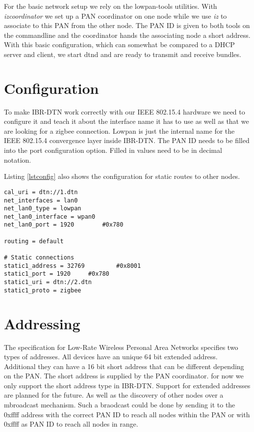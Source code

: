 For the basic network setup we rely on the lowpan-tools utilities. With
\emph{izcoordinator} we set up a PAN coordinator on one
node while we use \emph{iz} to associate to this PAN from the other node. The PAN ID is
given to both tools on the commandline and the coordinator hands the
associating node a short address. With this basic configuration, which can
somewhat be compared to a DHCP server and client, we start dtnd and are ready to
transmit and receive bundles.

\section{Configuration}

To make IBR-DTN work correctly with our IEEE 802.15.4 hardware we need to configure
it and teach it about the interface name it has to use as well as that we are
looking for a zigbee connection. Lowpan is just the internal name for the
IEEE 802.15.4 convergence layer inside IBR-DTN. The PAN ID needs to be filled into the
port configuration option. Filled in values need to be in decimal notation.

Listing \ref{lstconfig} also shows the configuration for static routes to other
nodes.

\begin{lstlisting}[caption= dtnd example configuration, label=lstconfig]
cal_uri = dtn://1.dtn
net_interfaces = lan0
net_lan0_type = lowpan
net_lan0_interface = wpan0
net_lan0_port = 1920		#0x780

routing = default

# Static connections
static1_address = 32769         #0x8001
static1_port = 1920		#0x780
static1_uri = dtn://2.dtn
static1_proto = zigbee
\end{lstlisting}

\section{Addressing}

The specification for Low-Rate Wireless Personal Area Networks specifies two
types of addresses. All devices have an unique 64 bit extended address.
Additional they can have a 16 bit short address that can be different depending
on the PAN. The short address is supplied by the PAN coordinator. for now we
only support the short address type in IBR-DTN. Support for extended addresses
are planned for the future. As well as the discovery of other nodes over a
mbroadcast mechanism. Such a braodcast could be done by sending it to the 0xffff
address with the correct PAN ID to reach all nodes within the PAN or with 0xffff
as PAN ID to reach all nodes in range.

